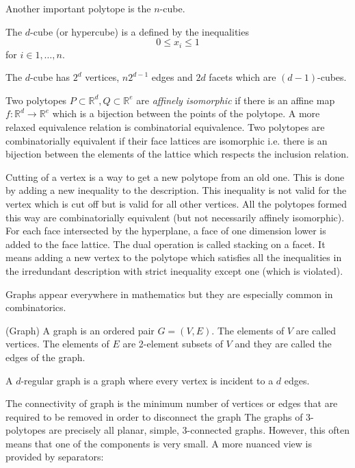 Another important polytope is the $n$-cube.

\begin{definition}
 The $d$-cube (or hypercube) is a defined by the inequalities
\begin{equation}
 0 \leq x_i \leq 1 
\end{equation}
for $i \in 1,\dots, n$.
\end{definition}
The $d$-cube has $2^d$ vertices, $n2^{d-1}$ edges and $2d$ facets which
are $(d-1)$-cubes.

Two polytopes $P\subset \mathbb{R}^d, Q \subset \mathbb{R}^e$ are 
\textit{affinely isomorphic} if there is an affine map $f: \mathbb{R}^d 
\rightarrow \mathbb{R}^e$ which is a bijection between the points of the 
polytope. A more relaxed equivalence relation is combinatorial equivalence. Two 
polytopes are combinatorially equivalent if their face lattices are isomorphic 
i.e. there is an bijection between the elements of the lattice which respects 
the inclusion relation. 

Cutting of a vertex is a way to get a new polytope from an old one. This is 
done by adding a new inequality to the description. This inequality is not 
valid for the vertex which is cut off but is valid for all other vertices. All 
the polytopes formed this way are combinatorially equivalent (but not 
necessarily affinely isomorphic). For each face intersected by the hyperplane, 
a face of one dimension lower is added to the face lattice. The dual operation 
is called stacking on a facet. It means adding a new vertex to the polytope 
which satisfies all the inequalities in the irredundant description with strict 
inequality except one (which is violated).

Graphs appear everywhere in mathematics but they are especially common in 
combinatorics. 

\begin{definition}
(Graph) A graph is an ordered pair $G=(V,E)$. The elements of $V$ are called 
vertices. The elements of $E$ are 2-element subsets of $V$ and they are called 
the edges of the graph. 
\end{definition}

A $d$-regular graph is a graph where every vertex is incident to a $d$ edges.

The connectivity of graph is the minimum number of vertices or edges that are 
required to be removed in order to disconnect the graph The graphs of 
3-polytopes are precisely all planar, simple, 3-connected graphs. However, this 
often means that one of the components is very small. A more nuanced view is 
provided 
by separators:


